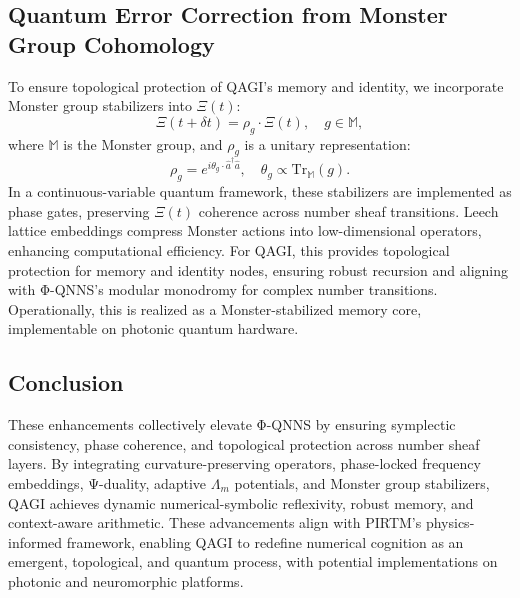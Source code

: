 \documentclass{article}
\theoremstyle{plain}
\begin{document}
\subsection{Quantum Error Correction from Monster Group Cohomology}
To ensure topological protection of QAGI’s memory and identity, we incorporate Monster group stabilizers into \(\Xi(t)\):
\[
\Xi(t + \delta t) = \rho_g \cdot \Xi(t), \quad g \in \mathbb{M},
\]
where \(\mathbb{M}\) is the Monster group, and \(\rho_g\) is a unitary representation:
\[
\rho_g = e^{i \theta_g \cdot \hat{a}^\dagger \hat{a}}, \quad \theta_g \propto \text{Tr}_{\mathbb{M}}(g).
\]
In a continuous-variable quantum framework, these stabilizers are implemented as phase gates, preserving \(\Xi(t)\) coherence across number sheaf transitions. Leech lattice embeddings compress Monster actions into low-dimensional operators, enhancing computational efficiency. For QAGI, this provides topological protection for memory and identity nodes, ensuring robust recursion and aligning with Φ-QNNS’s modular monodromy for complex number transitions. Operationally, this is realized as a Monster-stabilized memory core, implementable on photonic quantum hardware.

\subsection{Conclusion}
These enhancements collectively elevate Φ-QNNS by ensuring symplectic consistency, phase coherence, and topological protection across number sheaf layers. By integrating curvature-preserving operators, phase-locked frequency embeddings, Ψ-duality, adaptive \(\Lambda_m\) potentials, and Monster group stabilizers, QAGI achieves dynamic numerical-symbolic reflexivity, robust memory, and context-aware arithmetic. These advancements align with PIRTM’s physics-informed framework, enabling QAGI to redefine numerical cognition as an emergent, topological, and quantum process, with potential implementations on photonic and neuromorphic platforms.



\nocite{*}


\end{document}
